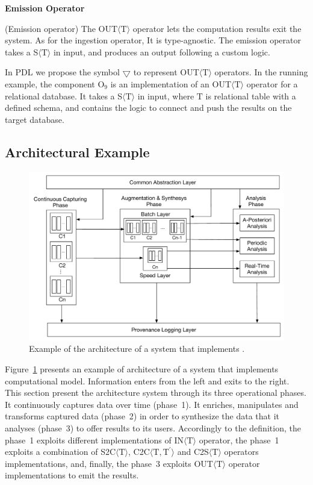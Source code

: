 \medskip
\noindent
\textbf{Emission Operator}
\medskip

\begin{Definition}
(Emission operator) The OUT$\langle\mathrm{T}\rangle$ operator lets the computation results exit the system. As for the ingestion operator, It is type-agnostic. The emission operator takes a S$\langle\mathrm{T}\rangle$ in input, and produces an output following a custom logic.
\end{Definition}

\noindent
In PDL we propose the symbol $\bigtriangledown$ to represent OUT$\langle\mathrm{T}\rangle$ operators. 
In the running example, the component O$_9$ is an implementation of an OUT$\langle\mathrm{T}\rangle$ operator for a relational database. It takes a S$\langle\mathrm{T}\rangle$ in input, where $\mathrm{T}$ is relational table with a defined schema, and contains the logic to connect and push the results on the target database. 

\subsection{Architectural Example}\label{sec:comp-mod-sol-arch}

\begin{figure}[t]
    \centering
    \includegraphics[width=\columnwidth]{img/computational-model-architecture}
    \caption{Example of the architecture of a system that implements \textnormal{\protect\river{}}.}
    \label{fig:arch}
\end{figure}

Figure~\ref{fig:arch} presents an example of architecture of a system that implements \river{} computational model. Information enters from the left and exits to the right.
This section present the architecture system through its three operational phases. 
It continuously captures data over time (phase~1). It enriches, manipulates and transforms captured data (phase~2) in order to synthesize the data that it analyses (phase~3) to offer results to its users.
Accordingly to the \river{} definition, the phase~1 exploits different implementations of IN$\langle\mathrm{T}\rangle$ operator, the phase~1 exploits a combination of S2C$\langle\mathrm{T}\rangle$, C2C$\langle\mathrm{T},\mathrm{T^{\prime}}\rangle$ and C2S$\langle\mathrm{T}\rangle$ operators implementations, and, finally, the phase~3 exploits OUT$\langle\mathrm{T}\rangle$ operator implementations to emit the results.

